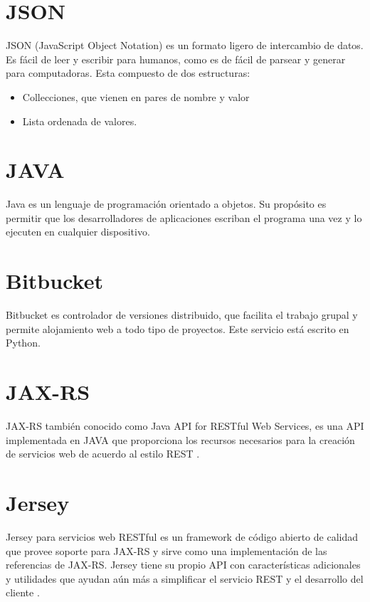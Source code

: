 \section{JSON} \label{sect:JSON}
JSON (JavaScript Object Notation) es un formato ligero de intercambio de datos. Es fácil de leer y escribir para humanos, como es de fácil de parsear y generar para computadoras\cite{Json}. Esta compuesto de dos estructuras:
\begin{itemize}[noitemsep,nolistsep]
\item Collecciones, que vienen en pares de nombre y valor
\item Lista ordenada de valores.
\end{itemize}

\section{JAVA} \label{sect:JAVA}
Java es un lenguaje de programación orientado a objetos. Su propósito es permitir que los desarrolladores de aplicaciones escriban el programa una vez y lo ejecuten en cualquier dispositivo.\cite{JV}

\section{Bitbucket} \label{sect:Bitbucket}
Bitbucket es controlador de versiones distribuido, que facilita el trabajo grupal y permite alojamiento web a todo tipo de proyectos. Este servicio está escrito en Python.\cite{BB}

\section{JAX-RS} \label{sect:JAX-RS}
JAX-RS también conocido como Java API for RESTful Web Services, es una API implementada en JAVA que proporciona los recursos necesarios para la creación de servicios web de acuerdo al estilo REST \cite{jar}.

\section{Jersey} \label{sect:Jersey}
Jersey para servicios web RESTful es un framework de código abierto de calidad que provee soporte para JAX-RS y sirve como una implementación de las referencias de JAX-RS. Jersey tiene su propio API con características adicionales y utilidades que ayudan aún más a simplificar el servicio REST y el desarrollo del cliente \cite{jersey}.

